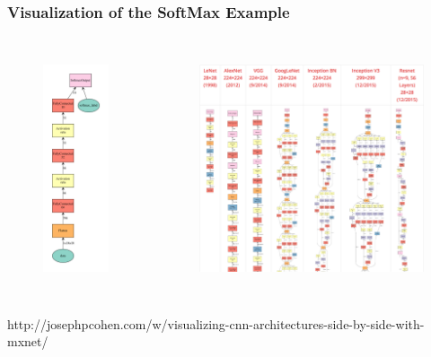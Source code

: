 \begin{frame}
	\MyLogo
	\frametitle{Visualization of the SoftMax Example}  

\vskip -10pt
\begin{columns}
\begin{figure}[htbp] 
	\includegraphics[height=2.75in]{figures/mxnet_graph.pdf} 
\end{figure}
%
\begin{figure}[htbp] 
	\includegraphics[height=2.75in]{figures/mxnet_graph_cnn.png} 
\end{figure}
\end{columns}
	
\medskip

\begin{center}
{\color{red}\scriptsize
http://josephpcohen.com/w/visualizing-cnn-architectures-side-by-side-with-mxnet/
}
\end{center}

\end{frame}